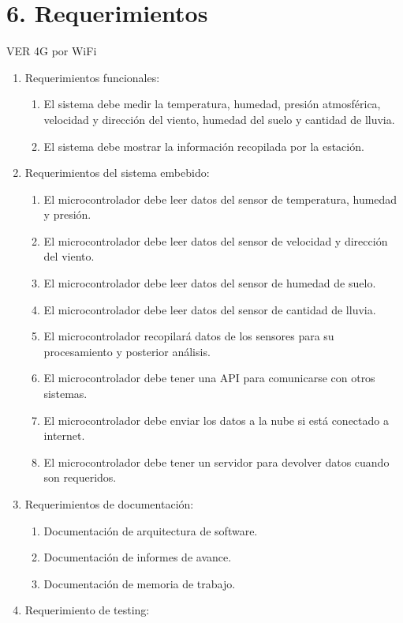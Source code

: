 \documentclass[
11pt, %
codirector, %
]{charter}
\begin{document}
\section{6. Requerimientos}
\label{sec:requerimientos}
VER 4G por WiFi
\begin{enumerate}
	\item Requerimientos funcionales:
		\begin{enumerate}
			\item El sistema debe medir la temperatura, humedad, presión atmosférica, velocidad y dirección del viento, humedad del suelo y cantidad de lluvia.
			\item El sistema debe mostrar la información recopilada por la estación.
		\end{enumerate}
	\item Requerimientos del sistema embebido:
		\begin{enumerate}
			\item El microcontrolador debe leer datos del sensor de temperatura, humedad y presión.
			\item El microcontrolador debe leer datos del sensor de velocidad y dirección del viento.
			\item El microcontrolador debe leer datos del sensor de humedad de suelo.
			\item El microcontrolador debe leer datos del sensor de cantidad de lluvia.			
			\item El microcontrolador recopilará datos de los sensores para su procesamiento y posterior análisis.
			\item El microcontrolador debe tener una API para comunicarse con otros sistemas.
			\item El microcontrolador debe enviar los datos a la nube si está conectado a internet.
			\item El microcontrolador debe tener un servidor para devolver datos cuando son requeridos.
		\end{enumerate}
	\item Requerimientos de documentación:
		\begin{enumerate}
			\item Documentación de arquitectura de software.
			\item Documentación de informes de avance.
			\item Documentación de memoria de trabajo.
		\end{enumerate}
	\item Requerimiento de testing:
		\begin{enumerate}

\end{enumerate}
\end{enumerate}
\end{document}
